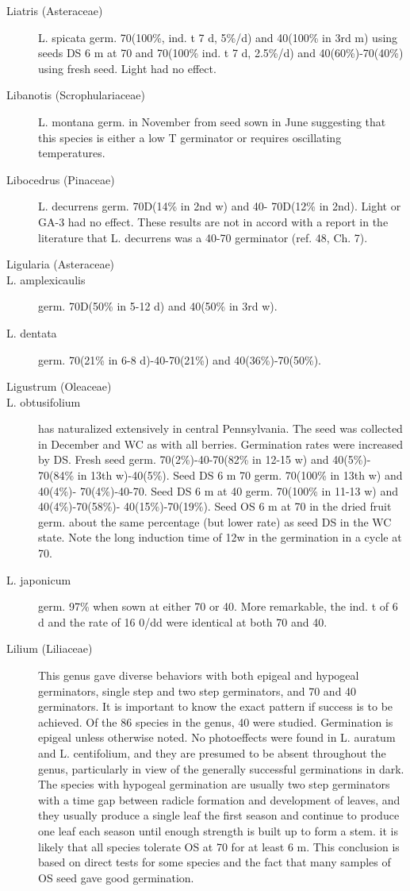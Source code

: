 \begin{description}
\item[Liatris (Asteraceae)] L. spicata germ. 70(100\%, ind. t 7 d, 5\%/d) and
40(100\% in 3rd m) using seeds DS 6 m at 70 and 70(100\% ind. t 7 d, 2.5\%/d) and
40(60\%)-70(40\%) using fresh seed. Light had no effect.

\item[Libanotis (Scrophulariaceae)] L. montana germ. in November from seed
sown in June suggesting that this species is either a low T germinator or requires
oscillating temperatures.
\item[Libocedrus (Pinaceae)] L. decurrens germ. 70D(14\% in 2nd w) and 40-
70D(12\% in 2nd). Light or GA-3 had no effect. These results are not in accord with a
report in the literature that L. decurrens was a 40-70 germinator (ref. 48, Ch. 7).

\item[Ligularia (Asteraceae)]
\item[L. amplexicaulis] germ. 70D(50\% in 5-12 d) and 40(50\% in 3rd w).
\item[L. dentata] germ. 70(21\% in 6-8 d)-40-70(21\%) and 40(36\%)-70(50\%).
\item[Ligustrum (Oleaceae)]
\item[L. obtusifolium] has naturalized extensively in central Pennsylvania. The seed
was collected in December and WC as with all berries. Germination rates were
increased by DS. Fresh seed germ. 70(2\%)-40-70(82\% in 12-15 w) and 40(5\%)-
70(84\% in 13th w)-40(5\%). Seed DS 6 m 70 germ. 70(100\% in 13th w) and 40(4\%)-
70(4\%)-40-70. Seed DS 6 m at 40 germ. 70(100\% in 11-13 w) and 40(4\%)-70(58\%)-
40(15\%)-70(19\%). Seed OS 6 m at 70 in the dried fruit germ. about the same
percentage (but lower rate) as seed DS in the WC state. Note the long induction time
of 12w in the germination in a cycle at 70.
\item[L. japonicum] germ. 97\% when sown at either 70 or 40. More remarkable, the
ind. t of 6 d and the rate of 16 0/dd were identical at both 70 and 40.

\item[Lilium (Liliaceae)] This genus gave diverse behaviors with both epigeal and
hypogeal germinators, single step and two step germinators, and 70 and 40
germinators. It is important to know the exact pattern if success is to be achieved. Of
the 86 species in the genus, 40 were studied. Germination is epigeal unless
otherwise noted. No photoeffects were found in L. auratum and L. centifolium, and
they are presumed to be absent throughout the genus, particularly in view of the
generally successful germinations in dark. The species with hypogeal germination are
usually two step germinators with a time gap between radicle formation and
development of leaves, and they usually produce a single leaf the first season and
continue to produce one leaf each season until enough strength is built up to form a
stem. it is likely that all species tolerate OS at 70 for at least 6 m. This conclusion is
based on direct tests for some species and the fact that many samples of OS seed
gave good germination.


\end{description}

